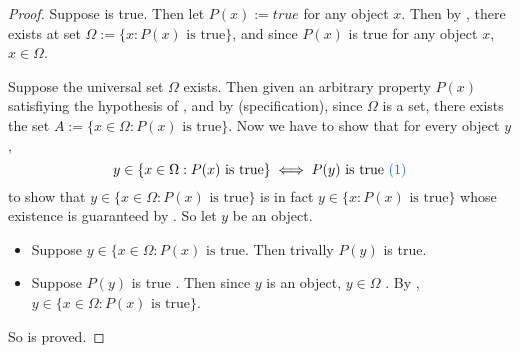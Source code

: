 \begin{proof}
Suppose  is true. Then let \(P(x) := true\) for any object \(x\). Then by , there exists at set \(\Omega := \{x : P(x) \text{ is true} \}\), and since \(P(x)\) is true for any object \(x\), \(x \in \Omega\).

Suppose the universal set \(\Omega\) exists. Then given an arbitrary property \(P(x)\) satisfiying the hypothesis of , and by  (specification), since \(\Omega\) is a set, there exists the set \(A := \{ x \in \Omega : P(x) \text{ is true} \}\). Now we have to show that for every object \(y\),
\[
    y \in \{x \in \Omega : P(x) \text{ is true} \} \iff P(y) \text{ is true \BLUE{(1)}}
\]
to show that \(y \in \{x \in \Omega : P(x) \text{ is true} \}\) is in fact \(y \in \{x : P(x) \text{ is true} \}\) whose existence is guaranteed by .
So let \(y\) be an object.
\begin{itemize}
    \item Suppose \(y \in \{x \in \Omega : P(x) \text{ is true} \). Then trivally \(P(y)\) is true.
    \item Suppose \(P(y)\) is true . Then since \(y\) is an object, \(y \in \Omega\) . By , \(y \in \{x \in \Omega : P(x) \text{ is true} \} \).
\end{itemize}
So  is proved.
\end{proof}

